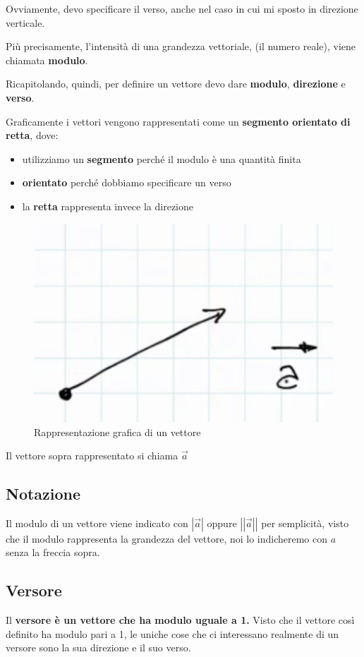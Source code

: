 Ovviamente, devo specificare il verso, anche nel caso in cui mi sposto in direzione verticale.

Più precisamente, l'intensità di una grandezza vettoriale, (il numero reale), viene chiamata \textbf{modulo}.

Ricapitolando, quindi, per definire un vettore devo dare \textbf{modulo}, \textbf{direzione} e \textbf{verso}. 

Graficamente i vettori vengono rappresentati come un \textbf{segmento orientato di retta},  dove:
\begin{itemize}
\item utilizziamo un \textbf{segmento} perché il modulo è una quantità finita
\item \textbf{orientato} perché dobbiamo specificare un verso
\item la \textbf{retta} rappresenta invece la direzione
\end{itemize}

\begin{figure}[h]
\begin{center}
\includegraphics[width = 0.5 \textwidth]{lezione1/images/vettore 1.png}
\caption{Rappresentazione grafica di un vettore}
\label{fig:vettore 1}
\end{center}
\end{figure}
Il vettore sopra rappresentato si chiama $\overrightarrow{a}$
\subsection{Notazione}
Il modulo di un vettore viene indicato con $\left | \overrightarrow{a} \right |$ oppure
$\left | \left | \overrightarrow{a} \right | \right |$ per semplicità, visto che il modulo rappresenta la grandezza del vettore, noi lo indicheremo con $a$ senza la freccia sopra.

\subsection{Versore}
Il \textbf{versore è un vettore che ha modulo uguale a 1.} Visto che il vettore così definito ha modulo pari a 1, le uniche cose che ci interessano realmente di un versore sono la sua direzione e il suo verso.

